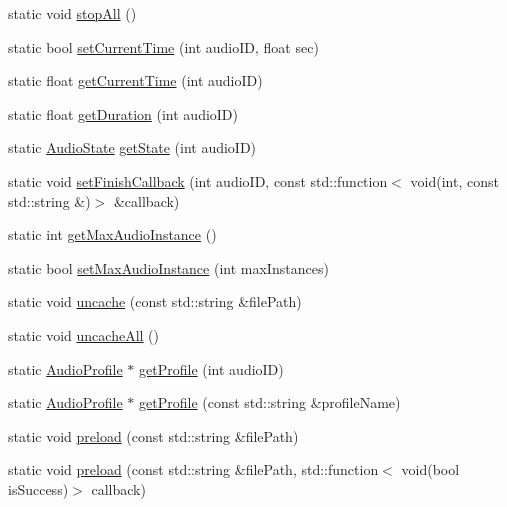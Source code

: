 \begin{DoxyCompactItemize}
\item 
static void \hyperlink{classexperimental_1_1AudioEngine_a911b9b9c56cf769fd561334870533d13}{stop\+All} ()
\item 
static bool \hyperlink{classexperimental_1_1AudioEngine_aa61e7a0b9ad959c203944ad701486dab}{set\+Current\+Time} (int audio\+ID, float sec)
\item 
static float \hyperlink{classexperimental_1_1AudioEngine_a03c38415583bde325e604cc9310d06ad}{get\+Current\+Time} (int audio\+ID)
\item 
static float \hyperlink{classexperimental_1_1AudioEngine_a09b8db5b79cc1dbdd99b57047cbc9d79}{get\+Duration} (int audio\+ID)
\item 
static \hyperlink{classexperimental_1_1AudioEngine_ab7becf9cab1f5e4cac089a1f6e3785e6}{Audio\+State} \hyperlink{classexperimental_1_1AudioEngine_a866cda5e583d0dce1b74fa596cae8ac1}{get\+State} (int audio\+ID)
\item 
static void \hyperlink{classexperimental_1_1AudioEngine_a641027899b3a5145093c4db1fae2d1ed}{set\+Finish\+Callback} (int audio\+ID, const std\+::function$<$ void(int, const std\+::string \&)$>$ \&callback)
\item 
static int \hyperlink{classexperimental_1_1AudioEngine_aa372906cea71863ac9c75873477ab049}{get\+Max\+Audio\+Instance} ()
\item 
static bool \hyperlink{classexperimental_1_1AudioEngine_a98a3cd56d393541c2c9d82620bbe0d84}{set\+Max\+Audio\+Instance} (int max\+Instances)
\item 
static void \hyperlink{classexperimental_1_1AudioEngine_ad4845a8b7855fc7f40058c86069f2a80}{uncache} (const std\+::string \&file\+Path)
\item 
static void \hyperlink{classexperimental_1_1AudioEngine_acd68e5058545e8daf10e28c5e66e8ef5}{uncache\+All} ()
\item 
static \hyperlink{classexperimental_1_1AudioProfile}{Audio\+Profile} $\ast$ \hyperlink{classexperimental_1_1AudioEngine_a9681b3ec692d7db066f9a4ce1564a5d2}{get\+Profile} (int audio\+ID)
\item 
static \hyperlink{classexperimental_1_1AudioProfile}{Audio\+Profile} $\ast$ \hyperlink{classexperimental_1_1AudioEngine_aadf65363a78655e56c65c4153f8c5bcd}{get\+Profile} (const std\+::string \&profile\+Name)
\item 
static void \hyperlink{classexperimental_1_1AudioEngine_ad4c37774e18b30de41731d22d467b0df}{preload} (const std\+::string \&file\+Path)
\item 
static void \hyperlink{classexperimental_1_1AudioEngine_abcbafbd980c76ea03872286fd9211b80}{preload} (const std\+::string \&file\+Path, std\+::function$<$ void(bool is\+Success)$>$ callback)

\end{DoxyCompactItemize}
